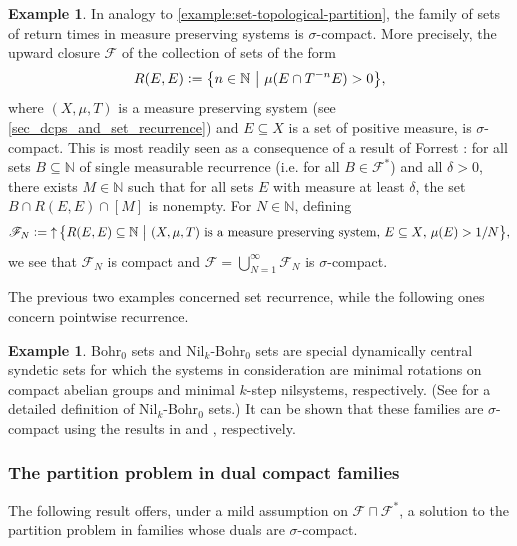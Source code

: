 \documentclass[letter,11pt]{article}
\theoremstyle{plain}
\theoremstyle{definition}
\newtheorem{example}[theorem]{Example}
\theoremstyle{plain}
\theoremstyle{plain}
\numberwithin{equation}{section}
\newcommand{\N}{\mathbb{N}}
\newcommand{\defeq}{\vcentcolon=}
\DeclareMathOperator{\upclose}{\uparrow}
\newcommand{\class}{\mathscr{F}}
\newcommand{\classcap}{\sqcap}
\newcommand{\family}{\mathscr{F}}
\begin{document}
\begin{example}
\label{example:set-measurable-partition}
    In analogy to \cref{example:set-topological-partition}, the family of sets of return times in measure preserving systems is $\sigma$-compact. More precisely, the upward closure $\family$ of the collection of sets of the form
    \begin{equation}\label{eq:sigma_compact_measurable}
        R(E,E) \defeq \big\{n \in \N \ \big| \ \mu(E \cap T^{-n} E)  > 0 \big\}, 
    \end{equation}
    where $(X, \mu, T)$ is a measure preserving system (see \cref{sec_dcps_and_set_recurrence}) and $E \subseteq X$ is a set of positive measure, is $\sigma$-compact.  This is most readily seen as a consequence of a result of Forrest \cite{Forrest_recurrence-in-dynamical-systems}: for all sets $B \subseteq \N$ of single measurable recurrence (i.e. for all $B \in \class^*$) and all $\delta > 0$, there exists $M \in \N$ such that for all sets $E$ with measure at least $\delta$, the set $B \cap R(E,E) \cap [M]$ is nonempty. For $N \in \N$, defining
    \[
        \class_N \defeq \upclose \big\{R(E,E) \subseteq \N \ \big| \ \text{$(X,\mu,T)$ is a measure preserving system, $E \subseteq X$, $\mu(E) > 1/N$} \big\},
    \]
    we see that $\class_N$ is compact and $\family = \bigcup_{N =1}^\infty \family_N$ is $\sigma$-compact.
\end{example}


The previous two examples concerned set recurrence, while the following ones concern pointwise recurrence.
\begin{example}
    Bohr$_0$ sets and  Nil$_k$-Bohr$_0$ sets are special dynamically central syndetic sets for which the systems in consideration are minimal rotations on compact abelian groups and minimal $k$-step nilsystems, respectively. (See \cite{Host-Kra_nilbohr} for a detailed definition of Nil$_k$-Bohr$_0$ sets.)
    It can be shown that these families are $\sigma$-compact using the results in \cite[Prop. 1.4]{Le-interpolation-first} and \cite[Lemma 3.3]{Le_interpolation_for_nilsequences}, respectively.
\end{example}




\subsubsection{The partition problem in dual compact families}

The following result offers, under a mild assumption on $\family \classcap \family^*$, a solution to the partition problem in families whose duals are $\sigma$-compact.
\end{document}
